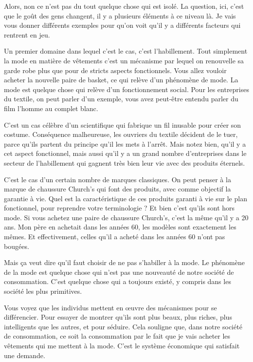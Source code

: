 \begin{small}
Alors, non ce n'est pas du tout quelque chose qui est isolé. La question, ici, c'est que le goût des gens changent, il y a plusieurs éléments à ce niveau là. Je vais vous donner différents exemples pour qu'on voit qu'il y a différents facteurs qui rentrent en jeu. 

Un premier domaine dans lequel c'est le cas, c'est l'habillement. Tout simplement la mode en matière de vêtements c'est un mécanisme par lequel on renouvelle sa garde robe plus que pour de stricts aspects fonctionnels.  Vous allez vouloir acheter la nouvelle paire de basket, ce qui relève d'un phénomène de mode. La mode est quelque chose qui relève d'un fonctionnement social. Pour les entreprises du textile, on peut parler d'un exemple, vous avez peut-être entendu parler du film l'homme au complet blanc. 


C'est un cas célèbre d'un scientifique  qui fabrique un fil inusable pour créer son costume. Conséquence malheureuse, les ouvriers du textile décident de le tuer, parce qu'ils partent du principe qu'il les mets à l’arrêt. 
\smallbreak
Mais notez bien, qu'il y a cet aspect fonctionnel, mais aussi qu'il y a un grand nombre d'entreprises dans le secteur de l'habillement qui gagnent très  bien leur vie avec des produits éternels. 

C'est le cas d'un certain nombre de marques classiques. On peut penser à la marque de chaussure Church's qui font des produits, avec comme objectif la garantie à vie. Quel est la caractéristique de ces produits garanti à vie sur le plan fonctionnel, pour reprendre votre terminologie ?  Et bien c'est qu'ils sont hors mode. Si vous achetez une paire de chaussure Church's, c'est la même qu'il y a 20 ans. Mon père en achetait dans les années 60, les modèles sont exactement les mêmes. Et effectivement, celles qu'il a acheté dans les années 60 n'ont pas bougées. 

Mais ça veut dire qu'il faut choisir de ne pas s'habiller à la mode. Le phénomène de la mode est quelque chose qui n'est pas une nouveauté de notre société de consommation. C'est quelque chose qui a toujours existé, y compris dans les société les plus primitives. 

Vous voyez que les individus mettent en œuvre des mécanismes pour se différencier. Pour essayer de montrer qu'ils sont plus beaux, plus riches, plus intelligents que les autres, et pour séduire. Cela souligne que, dans notre société de consommation, ce soit la consommation par le fait que je vais acheter les vêtements qui me mettent à la mode. C'est le système économique qui satisfait une demande. 


\end{small}
